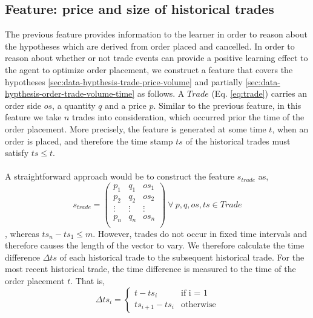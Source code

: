 \subsection{Feature: price and size of historical trades}
\label{sec:data-feature-2}
The previous feature provides information to the learner in order to reason about the hypotheses which are derived from order placed and cancelled.
In order to reason about whether or not trade events can provide a positive learning effect to the agent to optimize order placement, we construct a feature that covers the hypotheses \ref{sec:data-hypthesis-trade-price-volume} and partially \ref{sec:data-hypthesis-order-trade-volume-time} as follows.
A $Trade$ (Eq. \ref{eq:trade}) carries an order side $os$, a quantity $q$ and a price $p$.
Similar to the previous feature, in this feature we take $n$ trades into consideration, which occurred prior the time of the order placement.
More precisely, the feature is generated at some time $t$, when an order is placed, and therefore the time stamp $ts$ of the historical trades must satisfy $ts \leq t$.
\\
\\
A straightforward approach would be to construct the feature $s_{trade}$ as,
\begin{equation}
    s_{trade} =\begin{pmatrix}
        p_1 & q_1 & os_1 \\
        p_2 & q_2 & os_2 \\
        \vdots & \vdots & \vdots\\
        p_n & q_n & os_n \\
    \end{pmatrix}
    \ \forall \ p, q, os, ts \in Trade
\end{equation}, whereas $ts_n - ts_1 \leq m$.
However, trades do not occur in fixed time intervals and therefore causes the length of the vector to vary.
We therefore calculate the time difference $\Delta{ts}$ of each historical trade to the subsequent historical trade.
For the most recent historical trade, the time difference is measured to the time of the order placement $t$.
That is,
\begin{equation}
    \Delta{ts}_i = \begin{cases}
    t - ts_i &\text{if i = 1}\\
    ts_{i+1} - ts_i &\text{otherwise}
    \end{cases}
\end{equation}

